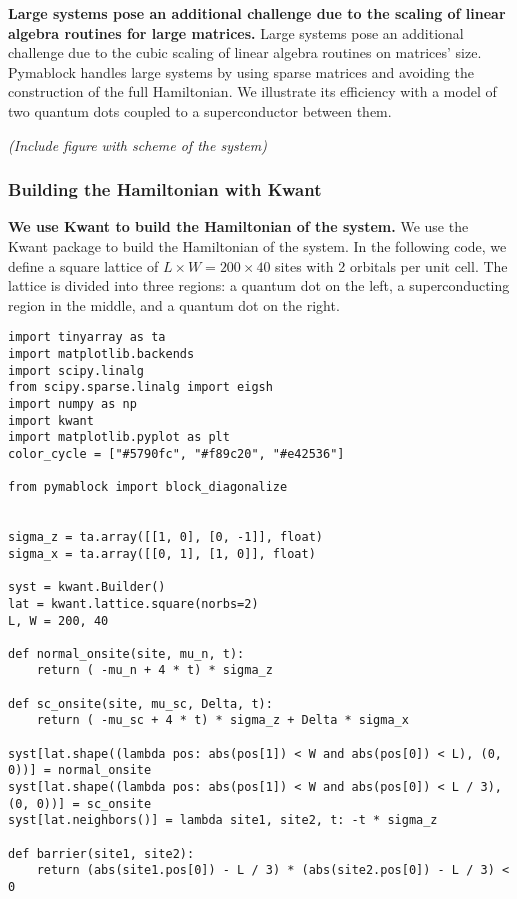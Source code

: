 \documentclass[submission, Codebases]{SciPost}
\begin{document}
{{\textbf{Large systems pose an additional challenge due to the scaling of linear
algebra routines for large matrices.}
Large systems pose an additional challenge due to the cubic scaling of linear algebra
routines on matrices' size.
Pymablock handles large systems by using sparse matrices and avoiding the
construction of the full Hamiltonian.
We illustrate its efficiency with a model of two quantum dots coupled to a
superconductor between them.

\textit{(Include figure with scheme of the system)}

\subsubsection{Building the Hamiltonian with Kwant}

\textbf{We use Kwant to build the Hamiltonian of the system.}
We use the Kwant package \cite{Groth_2014} to build
the Hamiltonian of the system.
In the following code, we define a square lattice of $L \times W = 200 \times
40$ sites with 2 orbitals per unit cell.
The lattice is divided into three regions: a quantum dot on the left, a
superconducting region in the middle, and a quantum dot on the right.

\begin{verbatim}
import tinyarray as ta
import matplotlib.backends
import scipy.linalg
from scipy.sparse.linalg import eigsh
import numpy as np
import kwant
import matplotlib.pyplot as plt
color_cycle = ["#5790fc", "#f89c20", "#e42536"]

from pymablock import block_diagonalize


sigma_z = ta.array([[1, 0], [0, -1]], float)
sigma_x = ta.array([[0, 1], [1, 0]], float)

syst = kwant.Builder()
lat = kwant.lattice.square(norbs=2)
L, W = 200, 40

def normal_onsite(site, mu_n, t):
    return ( -mu_n + 4 * t) * sigma_z

def sc_onsite(site, mu_sc, Delta, t):
    return ( -mu_sc + 4 * t) * sigma_z + Delta * sigma_x

syst[lat.shape((lambda pos: abs(pos[1]) < W and abs(pos[0]) < L), (0, 0))] = normal_onsite
syst[lat.shape((lambda pos: abs(pos[1]) < W and abs(pos[0]) < L / 3), (0, 0))] = sc_onsite
syst[lat.neighbors()] = lambda site1, site2, t: -t * sigma_z

def barrier(site1, site2):
    return (abs(site1.pos[0]) - L / 3) * (abs(site2.pos[0]) - L / 3) < 0


\end{verbatim}}}
\end{document}
